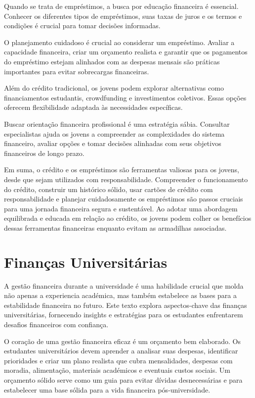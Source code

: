 \documentclass{report}
\begin{document}
Quando se trata de empréstimos, a busca por educação financeira é essencial. Conhecer os diferentes tipos de empréstimos, suas taxas de juros e os termos e condições é crucial para tomar decisões informadas.

O planejamento cuidadoso é crucial ao considerar um empréstimo. Avaliar a capacidade financeira, criar um orçamento realista e garantir que os pagamentos do empréstimo estejam alinhados com as despesas mensais são práticas importantes para evitar sobrecargas financeiras.

Além do crédito tradicional, os jovens podem explorar alternativas como financiamentos estudantis, crowdfunding e investimentos coletivos. Essas opções oferecem flexibilidade adaptada às necessidades específicas.

Buscar orientação financeira profissional é uma estratégia sábia. Consultar especialistas ajuda os jovens a compreender as complexidades do sistema financeiro, avaliar opções e tomar decisões alinhadas com seus objetivos financeiros de longo prazo.

Em suma, o crédito e os empréstimos são ferramentas valiosas para os jovens, desde que sejam utilizados com responsabilidade. Compreender o funcionamento do crédito, construir um histórico sólido, usar cartões de crédito com responsabilidade e planejar cuidadosamente os empréstimos são passos cruciais para uma jornada financeira segura e sustentável. Ao adotar uma abordagem equilibrada e educada em relação ao crédito, os jovens podem colher os benefícios dessas ferramentas financeiras enquanto evitam as armadilhas associadas.

\section{Finanças Universitárias}
\label{sec:Finanças Universitárias}

A gestão financeira durante a universidade é uma habilidade crucial que molda não apenas a experiencia académica, mas também estabelece as bases para a estabilidade financeira no futuro. Este texto explora aspectos-chave das finanças universitárias, fornecendo insights e estratégias para os estudantes enfrentarem desafios financeiros com confiança.

O coração de uma gestão financeira eficaz é um orçamento bem elaborado. Os estudantes universitários devem aprender a analisar suas despesas, identificar prioridades e criar um plano realista que cubra mensalidades, despesas com moradia, alimentação, materiais académicos e eventuais custos sociais. Um orçamento sólido serve como um guia para evitar dívidas desnecessárias e para estabelecer uma base sólida para a vida financeira pós-universidade.
\end{document}
